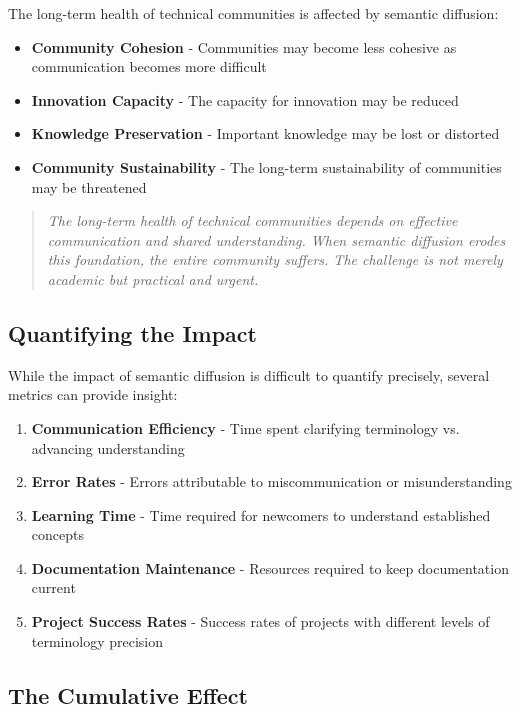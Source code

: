 \documentclass[11pt]{article}
\begin{document}
The long-term health of technical communities is affected by semantic diffusion:

\begin{itemize}
\item \textbf{Community Cohesion} - Communities may become less cohesive as communication becomes more difficult
\item \textbf{Innovation Capacity} - The capacity for innovation may be reduced
\item \textbf{Knowledge Preservation} - Important knowledge may be lost or distorted
\item \textbf{Community Sustainability} - The long-term sustainability of communities may be threatened
\end{itemize}

\begin{quote}
\emph{The long-term health of technical communities depends on effective communication and shared understanding. When semantic diffusion erodes this foundation, the entire community suffers. The challenge is not merely academic but practical and urgent.}
\end{quote}

\subsection{Quantifying the Impact}

While the impact of semantic diffusion is difficult to quantify precisely, several metrics can provide insight:

\begin{enumerate}
\item \textbf{Communication Efficiency} - Time spent clarifying terminology vs. advancing understanding
\item \textbf{Error Rates} - Errors attributable to miscommunication or misunderstanding
\item \textbf{Learning Time} - Time required for newcomers to understand established concepts
\item \textbf{Documentation Maintenance} - Resources required to keep documentation current
\item \textbf{Project Success Rates} - Success rates of projects with different levels of terminology precision
\end{enumerate}

\subsection{The Cumulative Effect}
\end{document}
